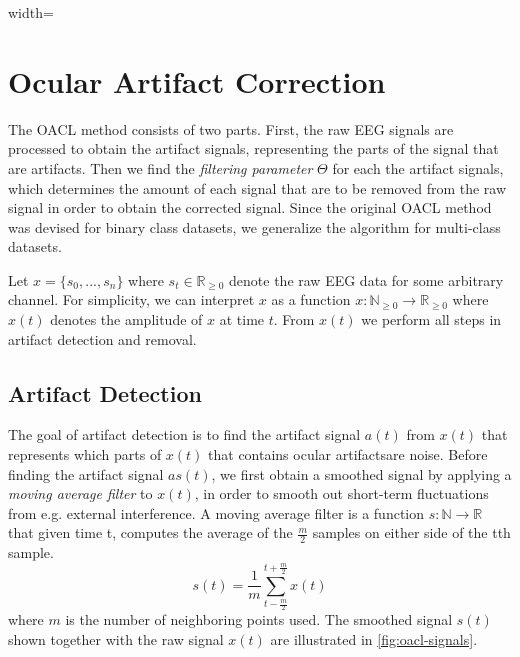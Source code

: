 \begin{figure*}%
	\centering
	\begin{adjustbox}{width=\textwidth}
		\newlength\figureheight
		\newlength\figurewidth
		\setlength\figureheight{6cm}
		\setlength\figurewidth{\textwidth}
		
	\end{adjustbox}
	\vspace{-2em}
	\label{fig:oacl-signals}
	\caption{Smoothed and artifact signal superimposed on the raw EEG signal for a single channel in part of a single trial.}
\end{figure*}
\section{Ocular Artifact Correction}\label{sec:oacl}
The OACL method consists of two parts. First, the raw EEG signals are processed to obtain the artifact signals, representing the parts of the signal that are artifacts. Then we find the \emph{filtering parameter} $\Theta$ for each the artifact signals, which determines the amount of each signal that are to be removed from the raw signal in order to obtain the corrected signal. 
Since the original OACL method \citep{li2015ocular} was devised for binary class datasets, we generalize the algorithm for multi-class datasets. 

Let $x = \{s_0, ...,s_n\}$ where $s_t \in \mathbb{R}_{\geq 0}$ denote the raw EEG data for some arbitrary channel. For simplicity, we can interpret $x$ as a function $x : \mathbb{N}_{\geq 0} \rightarrow \mathbb{R}_{\geq 0}$ where $x(t)$ denotes the amplitude of $x$ at time $t$. 
From $x(t)$ we perform all steps in artifact detection and removal.


\subsection{Artifact Detection}
The goal of artifact detection is to find the artifact signal $a(t)$ from $x(t)$ that represents which parts of $x(t)$ that contains ocular artifactsare noise. Before finding the artifact signal $as(t)$, we first obtain a smoothed signal by applying a \emph{moving average filter} to $x(t)$, in order to smooth out short-term fluctuations from e.g. external interference. A moving average filter is a function $s: \mathbb{N} \rightarrow \mathbb{R}$ that given time t, computes the average of the $\frac{m}{2}$ samples on either side of the tth sample. 
\begin{equation}
\label{eq:movavg}
s(t) = \frac{1}{m}\sum_{t-\frac{m}{2}}^{t+\frac{m}{2}}x(t)
\end{equation}
where $m$ is the number of neighboring points used. The smoothed signal $s(t)$ shown together with the raw signal $x(t)$ are illustrated in \cref{fig:oacl-signals}.

